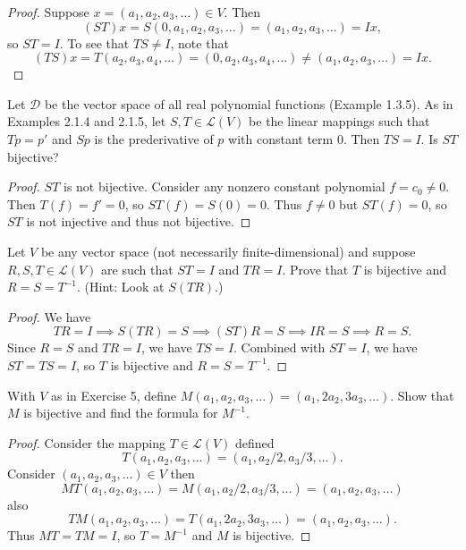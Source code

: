 \begin{proof}
    Suppose $x = (a_1, a_2, a_3, \ldots) \in V$. Then 
    \[(ST)x = S(0, a_1, a_2, a_3, \ldots) = (a_1, a_2, a_3, \ldots) = Ix,\]
    so $ST = I$. To see that $TS \ne I$, note that
    \[(TS)x = T(a_2, a_3, a_4, \ldots) = (0, a_2, a_3, a_4, \ldots) \ne (a_1, a_2, a_3, \ldots) = Ix.\]
\end{proof}

\begin{tcolorbox}[title=Problem 6, breakable]
    Let $\mathcal{D}$ be the vector space of all real polynomial functions (Example 1.3.5).
    As in Examples 2.1.4 and 2.1.5, let $S, T \in \mathcal{L}(V)$ be the linear mappings 
    such that $Tp = p'$ and $Sp$ is the prederivative of $p$ with constant term $0$. 
    Then $TS = I$. Is $ST$ bijective?
\end{tcolorbox}

\begin{proof}
    $ST$ is not bijective. Consider any nonzero constant polynomial $f = c_0 \ne 0$.
    Then $T(f) = f' = 0$, so $ST(f) = S(0) = 0$.
    Thus $f \ne 0$ but $ST(f) = 0$, so $ST$ is not injective and thus not bijective.
\end{proof}

\begin{tcolorbox}[title=Problem 7, breakable]
    Let $V$ be any vector space (not necessarily finite-dimensional) and suppose 
    $R, S, T \in \mathcal{L}(V)$ are such that $ST = I$ and $TR = I$. Prove that 
    $T$ is bijective and $R = S = T^{-1}$. (Hint: Look at $S(TR)$.)
\end{tcolorbox}

\begin{proof}
    We have 
    \[TR = I \implies S(TR) = S \implies (ST)R = S \implies IR = S \implies R = S.\]
    Since $R = S$ and $TR = I$, we have $TS = I$. Combined with $ST = I$, 
    we have $ST = TS = I$, so $T$ is bijective and $R = S = T^{-1}$.
\end{proof}

\begin{tcolorbox}[title=Problem 8, breakable]
    With $V$ as in Exercise 5, define $M(a_1, a_2, a_3, \ldots) = (a_1, 2a_2, 3a_3, \ldots)$. Show that $M$ 
    is bijective and find the formula for $M^{-1}$.
\end{tcolorbox}

\begin{proof}
    Consider the mapping $T \in \mathcal{L}(V)$ defined 
    \[T(a_1, a_2, a_3, \ldots) = (a_1, a_2/2, a_3/3, \ldots).\]
    Consider $(a_1, a_2, a_3, \ldots) \in V$ then 
    \[MT(a_1, a_2, a_3, \ldots) = M(a_1, a_2/2, a_3/3, \ldots) = (a_1, a_2, a_3, \ldots)\]
    also 
    \[TM(a_1, a_2, a_3, \ldots) = T(a_1, 2a_2, 3a_3, \ldots) = (a_1, a_2, a_3, \ldots).\]
    Thus $MT = TM = I$, so $T = M^{-1}$ and $M$ is bijective.
\end{proof}

